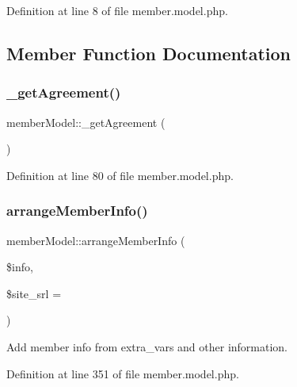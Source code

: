 Definition at line 8 of file member.\+model.\+php.



\subsection{Member Function Documentation}
\mbox{\label{classmemberModel_a77fb03f9f26568731dfad78b0b1572dd}} 
\subsubsection{\texorpdfstring{\+\_\+get\+Agreement()}{\_getAgreement()}}
{\footnotesize\ttfamily member\+Model\+::\+\_\+get\+Agreement (\begin{DoxyParamCaption}{ }\end{DoxyParamCaption})}



Definition at line 80 of file member.\+model.\+php.

\mbox{\label{classmemberModel_ad1420187d8b21fb78de5a5e4b4b47a3a}} 
\subsubsection{\texorpdfstring{arrange\+Member\+Info()}{arrangeMemberInfo()}}
{\footnotesize\ttfamily member\+Model\+::arrange\+Member\+Info (\begin{DoxyParamCaption}\item[{}]{\$info,  }\item[{}]{\$site\+\_\+srl = {} }\end{DoxyParamCaption})}



Add member info from extra\+\_\+vars and other information. 



Definition at line 351 of file member.\+model.\+php.

\mbox{\label{classmemberModel_a5970b2dcba76f9fc910cc3df7de19ac7}} 

